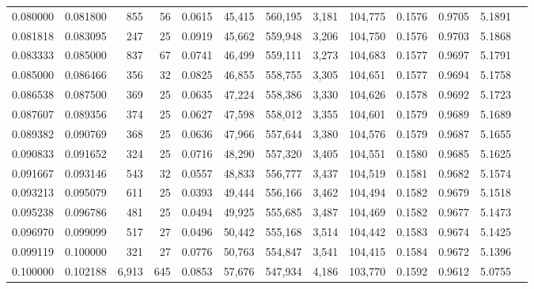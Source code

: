 \begin{tabular}{rrrrrrrrrrrrr}
0.080000 & 0.081800 &    855 &    56 &                                     0.0615 &  45,415 & 560,195 &   3,181 & 104,775 & 0.1576 & 0.9705 & 5.1891 \\
0.081818 & 0.083095 &    247 &    25 &                                     0.0919 &  45,662 & 559,948 &   3,206 & 104,750 & 0.1576 & 0.9703 & 5.1868 \\
0.083333 & 0.085000 &    837 &    67 &                                     0.0741 &  46,499 & 559,111 &   3,273 & 104,683 & 0.1577 & 0.9697 & 5.1791 \\
0.085000 & 0.086466 &    356 &    32 &                                     0.0825 &  46,855 & 558,755 &   3,305 & 104,651 & 0.1577 & 0.9694 & 5.1758 \\
0.086538 & 0.087500 &    369 &    25 &                                     0.0635 &  47,224 & 558,386 &   3,330 & 104,626 & 0.1578 & 0.9692 & 5.1723 \\
0.087607 & 0.089356 &    374 &    25 &                                     0.0627 &  47,598 & 558,012 &   3,355 & 104,601 & 0.1579 & 0.9689 & 5.1689 \\
0.089382 & 0.090769 &    368 &    25 &                                     0.0636 &  47,966 & 557,644 &   3,380 & 104,576 & 0.1579 & 0.9687 & 5.1655 \\
0.090833 & 0.091652 &    324 &    25 &                                     0.0716 &  48,290 & 557,320 &   3,405 & 104,551 & 0.1580 & 0.9685 & 5.1625 \\
0.091667 & 0.093146 &    543 &    32 &                                     0.0557 &  48,833 & 556,777 &   3,437 & 104,519 & 0.1581 & 0.9682 & 5.1574 \\
0.093213 & 0.095079 &    611 &    25 &                                     0.0393 &  49,444 & 556,166 &   3,462 & 104,494 & 0.1582 & 0.9679 & 5.1518 \\
0.095238 & 0.096786 &    481 &    25 &                                     0.0494 &  49,925 & 555,685 &   3,487 & 104,469 & 0.1582 & 0.9677 & 5.1473 \\
0.096970 & 0.099099 &    517 &    27 &                                     0.0496 &  50,442 & 555,168 &   3,514 & 104,442 & 0.1583 & 0.9674 & 5.1425 \\
0.099119 & 0.100000 &    321 &    27 &                                     0.0776 &  50,763 & 554,847 &   3,541 & 104,415 & 0.1584 & 0.9672 & 5.1396 \\
0.100000 & 0.102188 &  6,913 &   645 &                                     0.0853 &  57,676 & 547,934 &   4,186 & 103,770 & 0.1592 & 0.9612 & 5.0755 \\

\end{tabular}
